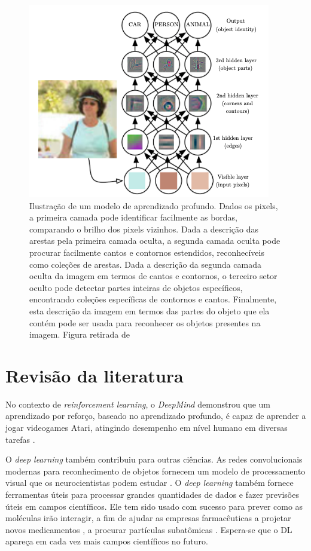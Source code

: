  \begin{figure}[h]
 \centering
 \includegraphics[width=.6 \textwidth]{conteudo/imgs/hierarquia-conceitos-dl.png}
 \caption[Ilustração de um modelo de aprendizado profundo]{Ilustração de um modelo de aprendizado profundo. Dados os pixels, a primeira camada pode identificar facilmente as bordas, comparando o brilho dos pixels vizinhos. Dada a descrição das arestas pela primeira camada oculta, a segunda camada oculta pode procurar facilmente cantos e contornos estendidos, reconhecíveis como coleções de arestas. Dada a descrição da segunda camada oculta da imagem em termos de cantos e contornos, o terceiro setor oculto pode detectar partes inteiras de objetos específicos, encontrando coleções específicas de contornos e cantos. Finalmente, esta descrição da imagem em termos das partes do objeto que ela contém pode ser usada para reconhecer os objetos presentes na imagem. Figura retirada de \cite{Goodfellow-et-al-2016}}
 \label{hierarquia-conceitos-dl}
 	\end{figure}

\section{Revisão da literatura }

No contexto de \textit{reinforcement learning}, o \textit{DeepMind} demonstrou que um aprendizado por reforço, baseado no aprendizado profundo, é capaz de aprender a jogar videogames Atari, atingindo desempenho em nível humano em diversas tarefas \cite{mnih-human-control-drl}.

O \textit{deep learning} também contribuiu para outras ciências. As redes convolucionais modernas para reconhecimento de objetos fornecem um modelo de processamento visual que os neurocientistas podem estudar \cite{dicarlo-afrax-yamins:2014}. O \textit{deep learning} também fornece ferramentas úteis para processar grandes quantidades de dados e fazer previsões úteis em campos científicos. Ele tem sido usado com sucesso para prever como as moléculas irão interagir, a fim de ajudar as empresas farmacêuticas a projetar novos medicamentos \cite{dahl2014multitask}, a procurar partículas subatômicas \cite{baldi:s:w:2015}. Espera-se que o DL apareça em cada vez mais campos científicos no futuro.








